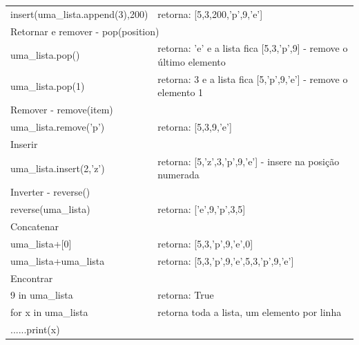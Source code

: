 \documentclass[landscape,a0paper,fontscale=0.285]{baposter} %
\begin{document}
\begin{poster}
{\begin{tabular}{@{}ll@{}}
							insert(uma\_lista.append(3),200) & retorna: [5,3,200,'p',9,'e'] \\
							\multicolumn{2}{l}{\cellcolor[HTML]{DDFFFF}Retornar e remover - pop(position)} \\
							uma\_lista.pop() & retorna: 'e' e a lista fica [5,3,'p',9] - remove o último elemento \\
							uma\_lista.pop(1) & retorna: 3 e a lista fica [5,'p',9,'e'] - remove o elemento 1 \\
							\multicolumn{2}{l}{\cellcolor[HTML]{DDFFFF}Remover - remove(item)} \\
							uma\_lista.remove('p') & retorna: [5,3,9,'e'] \\
							\multicolumn{2}{l}{\cellcolor[HTML]{DDFFFF}Inserir} \\
							uma\_lista.insert(2,'z') & retorna: [5,'z',3,'p',9,'e'] - insere na posição numerada \\
							\multicolumn{2}{l}{\cellcolor[HTML]{DDFFFF}Inverter - reverse()} \\
							reverse(uma\_lista) & retorna: ['e',9,'p',3,5] \\
							\multicolumn{2}{l}{\cellcolor[HTML]{DDFFFF}Concatenar} \\
							uma\_lista+[0] & retorna: [5,3,'p',9,'e',0] \\
							uma\_lista+uma\_lista & retorna: [5,3,'p',9,'e',5,3,'p',9,'e'] \\
							\multicolumn{2}{l}{\cellcolor[HTML]{DDFFFF}Encontrar} \\
							9 in uma\_lista & retorna: True \\
							for x in uma\_lista & retorna toda a lista, um elemento por linha \\
							......print(x) &  
						\end{tabular}
					}
				\end{poster}
				\newpage
				
				
\end{document}
